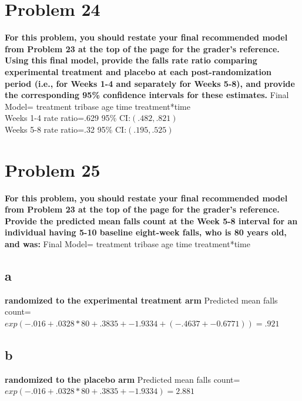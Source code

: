\documentclass{article}
\begin{document}
\begin{flushleft}
\section*{Problem 24}
\textbf{For this problem, you should restate your final recommended model from Problem 23 at the top of
	the page for the grader’s reference. Using this final model, provide the falls rate ratio comparing
	experimental treatment and placebo at each post-randomization period (i.e., for Weeks 1-4 and
	separately for Weeks 5-8), and provide the corresponding 95\% confidence intervals for these
	estimates.}\medbreak
Final Model= treatment tribase age time treatment*time\\
Weeks 1-4 rate ratio=.629 95\% CI:$(.482,.821)$\\ 
Weeks 5-8 rate ratio=.32  95\% CI:$(.195,.525)$\\ 
\pagebreak
\section*{Problem 25}
\textbf{For this problem, you should restate your final recommended model from Problem 23 at the top of
	the page for the grader’s reference. Provide the predicted mean falls count at the Week 5-8 interval
	for an individual having 5-10 baseline eight-week falls, who is 80 years old, and was:}
Final Model= treatment tribase age time treatment*time\\
\subsection*{a} \textbf{randomized to the experimental treatment arm} \medbreak
Predicted mean falls count=$exp(-.016+.0328*80+.3835+-1.9334+(-.4637+-0.6771))=.921$
\subsection*{b} \textbf{randomized to the placebo arm}\medbreak
Predicted mean falls count=$exp(-.016+.0328*80+.3835+-1.9334)=2.881$
\end{flushleft}
\end{document}
